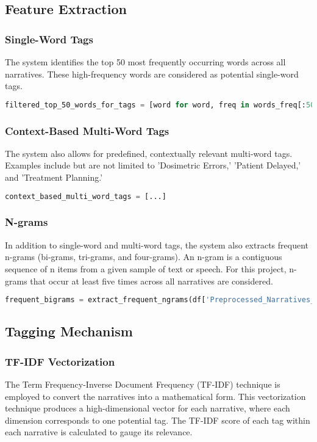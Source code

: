 \documentclass[12pt]{article}
\begin{document}
\subsection{Feature Extraction}

\subsubsection{Single-Word Tags}
The system identifies the top 50 most frequently occurring words across all narratives. These high-frequency words are considered as potential single-word tags.

\begin{lstlisting}[language=Python]
filtered_top_50_words_for_tags = [word for word, freq in words_freq[:50]]
\end{lstlisting}

\subsubsection{Context-Based Multi-Word Tags}
The system also allows for predefined, contextually relevant multi-word tags. Examples include but are not limited to 'Dosimetric Errors,' 'Patient Delayed,' and 'Treatment Planning.'

\begin{lstlisting}[language=Python]
context_based_multi_word_tags = [...]
\end{lstlisting}

\subsubsection{N-grams}
In addition to single-word and multi-word tags, the system also extracts frequent n-grams (bi-grams, tri-grams, and four-grams). An n-gram is a contiguous sequence of n items from a given sample of text or speech. For this project, n-grams that occur at least five times across all narratives are considered.

\begin{lstlisting}[language=Python]
frequent_bigrams = extract_frequent_ngrams(df['Preprocessed_Narratives_FullWords'], 2)
\end{lstlisting}

\subsection{Tagging Mechanism}

\subsubsection{TF-IDF Vectorization}
The Term Frequency-Inverse Document Frequency (TF-IDF) technique is employed to convert the narratives into a mathematical form. This vectorization technique produces a high-dimensional vector for each narrative, where each dimension corresponds to one potential tag. The TF-IDF score of each tag within each narrative is calculated to gauge its relevance.
\end{document}

